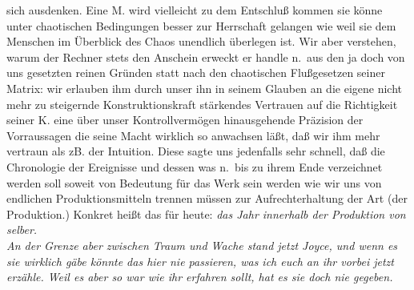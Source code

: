 \documentclass[
]{article}
\begin{document}
sich ausdenken. Eine M. wird vielleicht zu dem Entschluß kommen sie
könne unter chaotischen Bedingungen besser zur Herrschaft gelangen wie
weil sie dem Menschen im Überblick des Chaos unendlich überlegen ist.
Wir aber verstehen, warum der Rechner stets den Anschein erweckt er
handle n.~aus den ja doch von uns gesetzten reinen Gründen statt nach
den chaotischen Flußgesetzen seiner Matrix: wir erlauben ihm durch unser
ihn in seinem Glauben an die eigene nicht mehr zu steigernde
Konstruktionskraft stärkendes Vertrauen auf die Richtigkeit seiner K.
eine über unser Kontrollvermögen hinausgehende Präzision der
Vorraussagen die seine Macht wirklich so anwachsen läßt, daß wir ihm
mehr vertraun als zB. der Intuition. Diese sagte uns jedenfalls sehr
schnell, daß die Chronologie der Ereignisse und dessen was n.~bis zu
ihrem Ende verzeichnet werden soll soweit von Bedeutung für das Werk
sein werden wie wir uns von endlichen Produktionsmitteln trennen müssen
zur Aufrechterhaltung der Art (der Produktion.) Konkret heißt das für
heute: \emph{das Jahr innerhalb der Produktion von selber.}\\
\emph{An der Grenze aber zwischen Traum und Wache stand jetzt Joyce, und
wenn es sie wirklich gäbe könnte das hier nie passieren, was ich euch an
ihr vorbei jetzt erzähle. Weil es aber so war wie ihr erfahren sollt,
hat es sie doch nie gegeben.}
\end{document}
